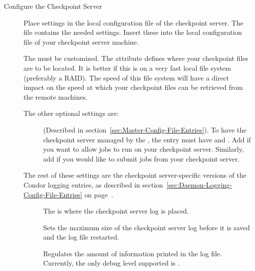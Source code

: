 \begin{description}

\item[Configure the Checkpoint Server]

Place settings in the local configuration file of
the checkpoint server.
The file  contains
the needed settings. Insert these into the local
configuration file of your checkpoint server machine. 

The   
must be customized.
The  attribute defines where your checkpoint files
are to be located. 
It is better if this is on a very fast local file system (preferably a
RAID). 
The speed of this file system will have a direct impact on the speed
at which your checkpoint files can be retrieved from the remote
machines. 

The other optional settings are:
\begin{description}

\item[] (Described in
section~\ref{sec:Master-Config-File-Entries}).  
To have the checkpoint server managed by the , the
 entry must have  and .
Add  if you want to allow jobs to run on your checkpoint server.
Similarly, add  if you would like to submit jobs from your
checkpoint server. 

\end{description}

The rest of these settings are the checkpoint server-specific versions
of the Condor logging entries, as described in
section~\ref{sec:Daemon-Logging-Config-File-Entries} on
page~\pageref{sec:Daemon-Logging-Config-File-Entries}.
\begin{description}

\item[] The  is where the
checkpoint server log is placed.

\item[] Sets the maximum
size of the checkpoint server log before it is saved and the
log file restarted.

\item[] Regulates
the amount of information
printed in the log file.
Currently, the only debug level supported is .


\end{description}
\end{description}
